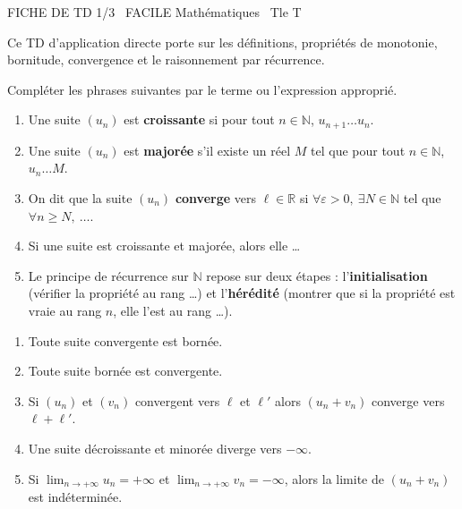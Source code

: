 \documentclass[11pt]{article}
\begin{document}
\begin{tcolorbox}[enhanced,colback=popink,colframe=popink,arc=10pt,boxrule=0pt,left=12pt,right=12pt,top=9pt,bottom=9pt]
{\color{white}\popxbold\small FICHE DE TD 1/3 \textbullet\ FACILE \hfill Mathématiques \textbullet\ Tle T\par}
\end{tcolorbox}
\vspace{4pt}
\noindent Ce TD d'application directe porte sur les définitions, propriétés de monotonie, bornitude, convergence et le raisonnement par récurrence.

\begin{exercice}
Compléter les phrases suivantes par le terme ou l'expression approprié.
\begin{enumerate}
    \item Une suite $(u_n)$ est \textbf{croissante} si pour tout $n \in \mathbb{N}$, $u_{n+1} \dots u_n$.
    \item Une suite $(u_n)$ est \textbf{majorée} s'il existe un réel $M$ tel que pour tout $n \in \mathbb{N}$, $u_n \dots M$.
    \item On dit que la suite $(u_n)$ \textbf{converge} vers $\ell \in \mathbb{R}$ si $\forall \varepsilon > 0,\ \exists N \in \mathbb{N}$ tel que $\forall n \geq N,\ \dots$.
    \item Si une suite est croissante et majorée, alors elle \dots
    \item Le principe de récurrence sur $\mathbb{N}$ repose sur deux étapes : l'\textbf{initialisation} (vérifier la propriété au rang \dots) et l'\textbf{hérédité} (montrer que si la propriété est vraie au rang $n$, elle l'est au rang \dots).
\end{enumerate}
\end{exercice}

\begin{exercice}
\begin{enumerate}
    \item Toute suite convergente est bornée.
    \item Toute suite bornée est convergente.
    \item Si $(u_n)$ et $(v_n)$ convergent vers $\ell$ et $\ell'$ alors $(u_n + v_n)$ converge vers $\ell + \ell'$.
    \item Une suite décroissante et minorée diverge vers $-\infty$.
    \item Si $\lim_{n\to+\infty} u_n = +\infty$ et $\lim_{n\to+\infty} v_n = -\infty$, alors la limite de $(u_n+v_n)$ est indéterminée.
\end{enumerate}
\end{exercice}
\end{document}
